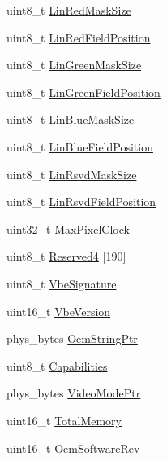 \begin{DoxyCompactItemize}
\item 
uint8\+\_\+t \hyperlink{struct____attribute_____a1fbcef2402fe6ce7f6c006bd50eaa6da}{Lin\+Red\+Mask\+Size}
\item 
uint8\+\_\+t \hyperlink{struct____attribute_____aff962b58f86a77f12b412d47125a4993}{Lin\+Red\+Field\+Position}
\item 
uint8\+\_\+t \hyperlink{struct____attribute_____af235e505028771ab2fb84778f4dfb476}{Lin\+Green\+Mask\+Size}
\item 
uint8\+\_\+t \hyperlink{struct____attribute_____a6683a63711dbc5dfb9a2a59c55deecd5}{Lin\+Green\+Field\+Position}
\item 
uint8\+\_\+t \hyperlink{struct____attribute_____ad8a25cec803bf91fb40a20a0aa5d5bf7}{Lin\+Blue\+Mask\+Size}
\item 
uint8\+\_\+t \hyperlink{struct____attribute_____a3f38d6becbe961786cd7ab58ec37fc07}{Lin\+Blue\+Field\+Position}
\item 
uint8\+\_\+t \hyperlink{struct____attribute_____a334886fc9a915ff91966c3aac1da586a}{Lin\+Rsvd\+Mask\+Size}
\item 
uint8\+\_\+t \hyperlink{struct____attribute_____a3df070e698b5f54814e20c8813f7bf7e}{Lin\+Rsvd\+Field\+Position}
\item 
uint32\+\_\+t \hyperlink{struct____attribute_____ab1fbd72846963ebb34a308a7edf7bbe1}{Max\+Pixel\+Clock}
\item 
uint8\+\_\+t \hyperlink{struct____attribute_____a2e13c4795a00241b919aa3aab86560ce}{Reserved4} \mbox{[}190\mbox{]}
\item 
uint8\+\_\+t \hyperlink{struct____attribute_____a6b319b7f1d18ea66e69de3a573c60b15}{Vbe\+Signature}
\item 
uint16\+\_\+t \hyperlink{struct____attribute_____a7b9fef89774326b46f9481cbd9a397d3}{Vbe\+Version}
\item 
phys\+\_\+bytes \hyperlink{struct____attribute_____a20ab55e9dda8d437875255529c1cffe8}{Oem\+String\+Ptr}
\item 
uint8\+\_\+t \hyperlink{struct____attribute_____a2ee0214fbaf7a7da7462f1e270d16f6d}{Capabilities}
\item 
phys\+\_\+bytes \hyperlink{struct____attribute_____a9d989fdbcdad6a40c10fc28c0f9af760}{Video\+Mode\+Ptr}
\item 
uint16\+\_\+t \hyperlink{struct____attribute_____a3e7b41e709394a10b3667e7f27f1aa7a}{Total\+Memory}
\item 
uint16\+\_\+t \hyperlink{struct____attribute_____a133984a56ec19abf4fcb2e6ae71d6498}{Oem\+Software\+Rev}
\item 

\end{DoxyCompactItemize}

